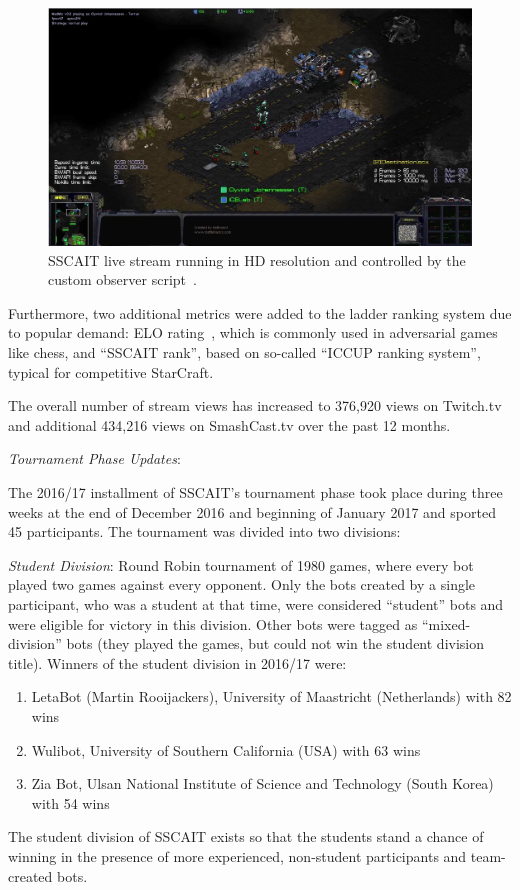 \begin{figure}[t]
  \centering
  \includegraphics[width=1\columnwidth]{fig/sscait-stream.png}
  \caption{SSCAIT live stream running in HD resolution and controlled by the custom observer script~\cite{mattsson2015automatic}.}
  \label{figSSCAITstream}
\end{figure}

Furthermore, two additional metrics were added to the ladder ranking system due to popular demand: ELO rating~\cite{elo1978rating}, which is commonly used in adversarial games like chess, and ``SSCAIT rank'', based on so-called ``ICCUP ranking system'', typical for competitive StarCraft.

The overall number of stream views has increased to 376,920 views on Twitch.tv and additional 434,216 views on SmashCast.tv over the past 12 months. 

\vskip 5mm 
\noindent \emph{Tournament Phase Updates}:
\vskip 2mm 

\noindent The 2016/17 installment of SSCAIT's tournament phase took place during three weeks at the end of December 2016 and beginning of January 2017 and sported 45 participants. The tournament was divided into two divisions:

\emph{Student Division}: Round Robin tournament of 1980 games, where every bot played two games against every opponent. Only the bots created by a single participant, who was a student at that time, were considered ``student'' bots and were eligible for victory in this division. Other bots were tagged as ``mixed-division'' bots (they played the games, but could not win the student division title). Winners of the student division in 2016/17 were:
  \begin{enumerate}
	\item LetaBot (Martin Rooijackers), University of Maastricht (Netherlands) with 82 wins
	\item Wulibot, University of Southern California (USA) with 63 wins
	\item Zia Bot, Ulsan National Institute of Science and Technology (South Korea) with 54 wins
  \end{enumerate}
The student division of SSCAIT exists so that the students stand a chance of winning in the presence of more experienced, non-student participants and team-created bots.

